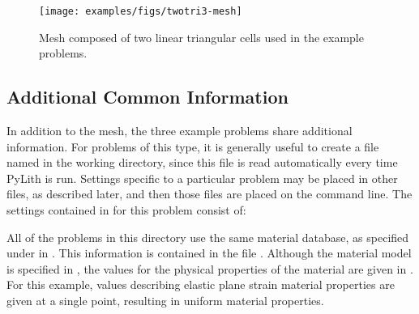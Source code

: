 \begin{figure}
  \texttt{[image: examples/figs/twotri3-mesh]}
  \caption{Mesh composed of two linear triangular cells used in the
    example problems.}
  \label{fig:twotri3-mesh}
\end{figure}


\subsection{Additional Common Information}

In addition to the mesh, the three example problems share additional
information. For problems of this type, it is generally useful to
create a file named  in the working directory,
since this file is read automatically every time PyLith is
run. Settings specific to a particular problem may be placed in other
 files, as described later, and then those files are
placed on the command line. The settings contained in
 for this problem consist of:
\begin{inventory}
\end{inventory}
All of the problems in this directory use the same material database,
as specified under  in
. This information is contained in the file
. Although the material model is
specified in , the values for the physical
properties of the material are given in
. For this example, values describing
elastic plane strain material properties are given at a single point,
resulting in uniform material properties.


